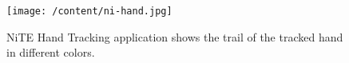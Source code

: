 \begin{figure}
	\centering 
	\texttt{[image: /content/ni-hand.jpg]} \caption{NiTE Hand Tracking application shows the trail of the tracked hand in different colors. \cite{12} } \label{fg:ni:hand} 
\end{figure}
